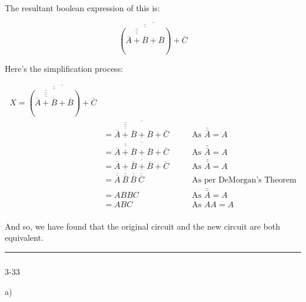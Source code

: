 \documentclass[
  a4paper,
]{article}
\makeatletter
\let\oldsubparagraph\subparagraph
\renewcommand{\subparagraph}{
    \@ifstar
      \xxxSubParagraphStar
      \xxxSubParagraphNoStar
  }
\newcommand{\xxxSubParagraphStar}[1]{\oldsubparagraph*{#1}\mbox{}}
\newcommand{\xxxSubParagraphNoStar}[1]{\oldsubparagraph{#1}\mbox{}}
\makeatother
\begin{document}
\begin{figure}


\caption{\label{fig-q29-resultant-circuit}}

\end{figure}%

The resultant boolean expression of this is:

\[\overline{\overline{\overline{\left(\overline{\overline{\overline{\overline{\overline{A}+\overline{B}}}}}+\overline{B}\right)}}+\overline{C}}\]

Here's the simplification process:

\begin{align*}
X =\overline{\overline{\overline{\left(\overline{\overline{\overline{\overline{\overline{A}+\overline{B}}}}}+\overline{B}\right)}}+\overline{C}} \\
  &= \overline{{\overline{{\overline{{\overline{{\overline{{\overline{{A}}}+{\overline{{B}}}}}}}}}}}+{\overline{{B}}}+\overline{C}}
    &\qquad \text{As } \bar{\bar{A}} = A \\
  &= \overline{{\overline{{\overline{{\overline{{A}}}+{\overline{{B}}}}}}}+\overline{B}+\overline{C}}
    &\qquad \text{As } \bar{\bar{A}} = A \\
  &= \overline{{\overline{{A}}}+{\overline{{B}}}+{\overline{{B}}}+{\overline{{C}}}}
    &\qquad \text{As } \bar{\bar{A}} = A \\
  &= {\overline{{\overline{{A}}}}}\ {\overline{{\overline{{B}}}}}\ {\overline{{\overline{{B}}}}}\ {\overline{{\overline{{C}}}}}
    &\qquad \text{As per DeMorgan's Theorem} \\
  &= A{B}{B}{C}
    &\qquad \text{As } \bar{\bar{A}} = A \\
  &= \boxed{A{B}C}
    &\qquad \text{As } AA = A \\
\end{align*}

And so, we have found that the original circuit and the new circuit are
both equivalent.

\begin{center}\rule{0.5\linewidth}{0.5pt}\end{center}

\subparagraph{3-33}\label{section-1}

a)
\end{document}
